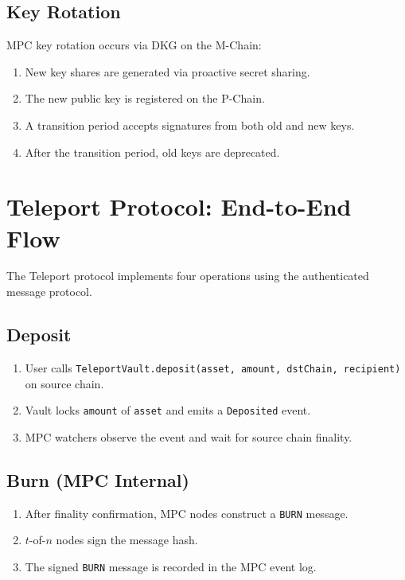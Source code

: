 \documentclass[11pt,a4paper]{article}
\begin{document}
\subsection{Key Rotation}

MPC key rotation occurs via DKG on the M-Chain:
\begin{enumerate}[leftmargin=2em]
\item New key shares are generated via proactive secret sharing.
\item The new public key is registered on the P-Chain.
\item A transition period accepts signatures from both old and new keys.
\item After the transition period, old keys are deprecated.
\end{enumerate}

\section{Teleport Protocol: End-to-End Flow}

The Teleport protocol implements four operations using the authenticated message protocol.

\subsection{Deposit}

\begin{enumerate}[leftmargin=2em]
\item User calls \texttt{TeleportVault.deposit(asset, amount, dstChain, recipient)} on source chain.
\item Vault locks \texttt{amount} of \texttt{asset} and emits a \texttt{Deposited} event.
\item MPC watchers observe the event and wait for source chain finality.
\end{enumerate}

\subsection{Burn (MPC Internal)}

\begin{enumerate}[leftmargin=2em]
\item After finality confirmation, MPC nodes construct a \texttt{BURN} message.
\item $t$-of-$n$ nodes sign the message hash.
\item The signed \texttt{BURN} message is recorded in the MPC event log.
\end{enumerate}
\end{document}
